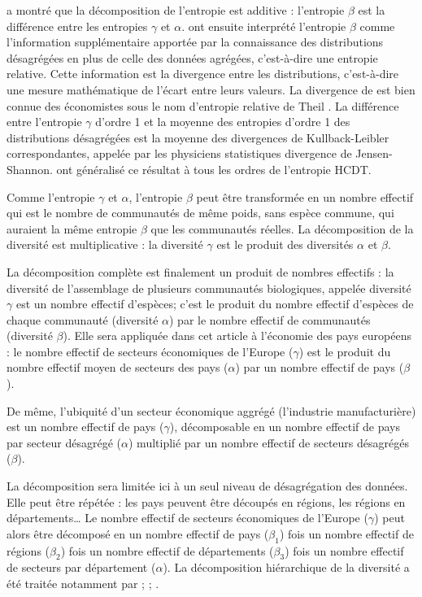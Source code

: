 \documentclass[fleqn,10pt]{ArtEcoFoG} %
\begin{document}
\citet{Jost2007} a montré que la décomposition de l'entropie est
additive : l'entropie \(\beta\) est la différence entre les entropies
\(\gamma\) et \(\alpha\). \citet{Marcon2012a} ont ensuite interprété
l'entropie \(\beta\) comme l'information supplémentaire apportée par la
connaissance des distributions désagrégées en plus de celle des données
agrégées, c'est-à-dire une entropie relative. Cette information est la
divergence entre les distributions, c'est-à-dire une mesure mathématique
de l'écart entre leurs valeurs. La divergence de \citet{Kullback1951}
est bien connue des économistes sous le nom d'entropie relative de Theil
\citep{Conceicao2000}. La différence entre l'entropie \(\gamma\) d'ordre
1 et la moyenne des entropies d'ordre 1 des distributions désagrégées
est la moyenne des divergences de Kullback-Leibler correspondantes,
appelée par les physiciens statistiques \og divergence de
Jensen-Shannon\fg{}. \citet{Marcon2014a} ont généralisé ce résultat à
tous les ordres de l'entropie HCDT.

Comme l'entropie \(\gamma\) et \(\alpha\), l'entropie \(\beta\) peut
être transformée en un nombre effectif qui est le nombre de communautés
de même poids, sans espèce commune, qui auraient la même entropie
\(\beta\) que les communautés réelles. La décomposition de la diversité
est multiplicative : la diversité \(\gamma\) est le produit des
diversités \(\alpha\) et \(\beta\).

La décomposition complète est finalement un produit de nombres effectifs
: la diversité de l'assemblage de plusieurs communautés biologiques,
appelée diversité \(\gamma\) est un nombre effectif d'espèces; c'est le
produit du nombre effectif d'espèces de chaque communauté (diversité
\(\alpha\)) par le nombre effectif de communautés (diversité \(\beta\)).
Elle sera appliquée dans cet article à l'économie des pays européens :
le nombre effectif de secteurs économiques de l'Europe (\(\gamma\)) est
le produit du nombre effectif moyen de secteurs des pays (\(\alpha\))
par un nombre effectif de pays (\(\beta\)).

De même, l'ubiquité d'un secteur économique aggrégé (l'industrie
manufacturière) est un nombre effectif de pays (\(\gamma\)),
décomposable en un nombre effectif de pays par secteur désagrégé
(\(\alpha\)) multiplié par un nombre effectif de secteurs désagrégés
(\(\beta\)).

La décomposition sera limitée ici à un seul niveau de désagrégation des
données. Elle peut être répétée : les pays peuvent être découpés en
régions, les régions en départements\ldots{} Le nombre effectif de
secteurs économiques de l'Europe (\(\gamma\)) peut alors être décomposé
en un nombre effectif de pays (\(\beta_1\)) fois un nombre effectif de
régions (\(\beta_2\)) fois un nombre effectif de départements
(\(\beta_3\)) fois un nombre effectif de secteurs par département
(\(\alpha\)). La décomposition hiérarchique de la diversité a été
traitée notamment par \citet{Marcon2012a}; \citet{Richard-Hansen2015};
\citet{Pavoine2015a}.
\end{document}
